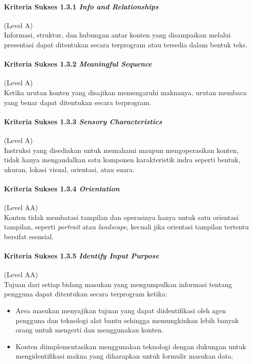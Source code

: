 \paragraph{Kriteria Sukses 1.3.1 \textit{Info and Relationships}}
\label{sec:kriteria_sukses_1.3.1}
(Level A)\\

Informasi, struktur, dan hubungan antar konten yang disampaikan melalui presentasi dapat ditentukan secara terprogram atau tersedia dalam bentuk teks. 

\paragraph{Kriteria Sukses 1.3.2 \textit{Meaningful Sequence}}
\label{sec:kriteria_sukses_1.3.2}
(Level A)\\

Ketika urutan konten yang disajikan memengaruhi maknanya, urutan membaca yang benar dapat ditentukan secara terprogram.

\paragraph{Kriteria Sukses 1.3.3 \textit{Sensory Characteristics}}
\label{sec:kriteria_sukses_1.3.3}
(Level A)\\

Instruksi yang disediakan untuk memahami maupun mengoperasikan konten, tidak hanya mengandalkan satu komponen karakteristik indra seperti bentuk, ukuran, lokasi visual, orientasi, atau suara.

\paragraph{Kriteria Sukses 1.3.4 \textit{Orientation}}
\label{sec:kriteria_sukses_1.3.4}
(Level AA)\\

Konten tidak membatasi tampilan dan operasinya hanya untuk satu orientasi tampilan, seperti \textit{portrait} atau \textit{landscape}, kecuali jika orientasi tampilan tertentu bersifat esensial.

\paragraph{Kriteria Sukses 1.3.5 \textit{Identify Input Purpose}}
\label{sec:kriteria_sukses_1.3.5}
(Level AA)\\

Tujuan dari setiap bidang masukan yang mengumpulkan informasi tentang pengguna dapat ditentukan secara terprogram ketika:
\begin{itemize}
	\item Area masukan menyajikan tujuan yang dapat diidentifikasi oleh agen pengguna dan teknologi alat bantu sehingga memungkinkan lebih banyak orang untuk mengerti dan menggunakan konten.
	\item Konten diimplementasikan menggunakan teknologi dengan dukungan untuk mengidentifikasi makna yang diharapkan untuk formulir masukan data.
\end{itemize}

